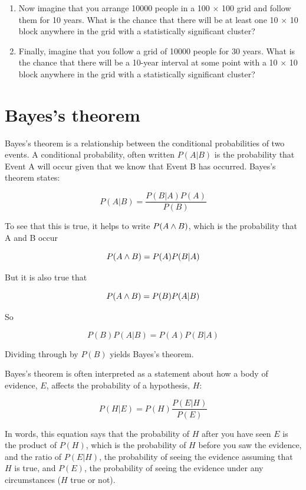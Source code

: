 \documentclass[12pt]{book}
\begin{document}
\begin{ex}
\begin{enumerate}
\item Now imagine that you arrange 10000 people in a 100 $\times$ 100
  grid and follow them for 10 years.  What is the chance that there
  will be at least one 10 $\times$ 10 block anywhere in the grid
  with a statistically significant cluster?

\item Finally, imagine that you follow a grid of 10000 people for 30
  years.  What is the chance that there will be a 10-year interval
  at some point with a 10 $\times$ 10 block anywhere in the grid
  with a statistically significant cluster?

\end{enumerate}

\end{ex}



\section{Bayes's theorem}

Bayes's theorem is a relationship between the conditional probabilities
of two events.  A conditional probability, often written $P(A|B)$ is
the probability that Event A will occur given that we know that
Event B has occurred.  Bayes's theorem states:

\[ P(A|B) = \frac{P(B|A)P(A)}{P(B)} \]

To see that this is true, it helps to write $P(A \wedge B)$, which
is the probability that A and B occur

\[ P(A \wedge B) = P(A) P(B|A) \]

But it is also true that 
 
\[ P(A \wedge B) = P(B) P(A|B) \]

So

\[ P(B) P(A|B) = P(A) P(B|A) \]

Dividing through by $P(B)$ yields Bayes's theorem.

Bayes's theorem is often interpreted as a statement about 
how a body of evidence, $E$, affects the probability of a 
hypothesis, $H$:

\[ P(H|E) = P(H) \frac{P(E|H)}{P(E)} \]

In words, this equation says that the probability of $H$ after you
have seen $E$ is the product of $P(H)$, which is the probability of
$H$ before you saw the evidence, and the ratio of $P(E|H)$, the
probability of seeing the evidence assuming that $H$ is true, and
$P(E)$, the probability of seeing the evidence under any circumstances
($H$ true or not).
\end{document}
